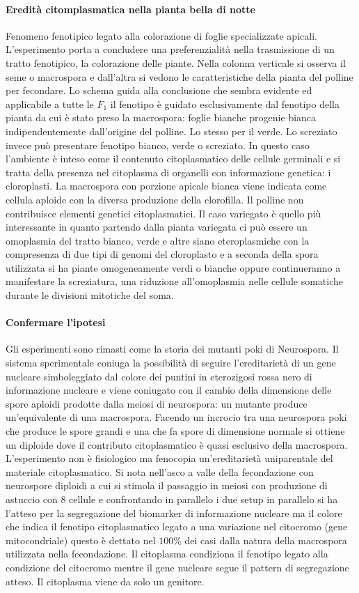 \paragraph{Eredit\`a citomplasmatica nella pianta bella di notte}
Fenomeno fenotipico legato alla colorazione di foglie specializzate apicali. L'esperimento porta a concludere una preferenzialit\`a nella trasmissione di un tratto fenotipico, la 
colorazione delle piante. Nella colonna verticale si osserva il seme o macrospora e dall'altra si vedono le caratteristiche della pianta del polline per fecondare. Lo schema guida
alla conclusione che sembra evidente ed applicabile a tutte le $F_1$ il fenotipo \`e guidato esclusivamente dal fenotipo della pianta da cui \`e stato preso la macrospora: foglie bianche
progenie bianca indipendentemente dall'origine del polline. Lo stesso per il verde. Lo screziato invece pu\`o presentare fenotipo bianco, verde o screziato. In questo caso 
l'ambiente \`e inteso come il contenuto citoplasmatico delle cellule germinali e si tratta della presenza nel citoplasma di organelli con informazione genetica: i cloroplasti. La
macrospora con porzione apicale bianca viene indicata come cellula aploide con la diversa produzione della clorofilla. Il polline non contribuisce elementi genetici citoplasmatici. 
Il caso variegato \`e quello pi\`u interessante in quanto partendo dalla pianta variegata ci pu\`o essere un omoplasmia del tratto bianco, verde e altre siano eteroplasmiche con la 
compresenza di due tipi di genomi del cloroplasto e a seconda della spora utilizzata si ha piante omogeneamente verdi o bianche oppure continueranno a manifestare la screziatura, una
riduzione all'omoplasmia nelle cellule somatiche durante le divisioni mitotiche del soma. 
\paragraph{Confermare l'ipotesi}
Gli esperimenti sono rimasti come la storia dei mutanti poki di Neurospora. Il sistema sperimentale coniuga la possibilit\`a di seguire l'ereditariet\`a di un gene nucleare simboleggiato
dal colore dei puntini in eterozigosi rossa nero di informazione nucleare e viene coniugato con il cambio della dimensione delle spore aploidi prodotte dalla meiosi di neurospora: un
mutante produce un'equivalente di una macrospora. Facendo un incrocio tra una neurospora poki che produce le spore grandi e una che fa spore di dimensione normale si ottiene un diploide
dove il contributo citoplasmatico \`e quasi esclusivo della macrospora. L'esperimento non \`e fisiologico ma fenocopia un'ereditariet\`a uniparentale del materiale citoplasmatico. 
Si nota nell'asco a valle della fecondazione con neurospore diploidi a cui si stimola il passaggio in meiosi con produzione di astuccio con $8$ cellule e confrontando in parallelo
i due setup in parallelo si ha l'atteso per la segregazione del biomarker di informazione nucleare ma il colore che indica il fenotipo citoplasmatico legato a una variazione nel 
citocromo (gene mitocondriale) questo \`e dettato nel $100\%$ dei casi dalla natura della macrospora utilizzata nella fecondazione. Il citoplasma condiziona il fenotipo legato alla
condizione del citocromo mentre il gene nucleare segue il pattern di segregazione atteso. Il citoplasma viene da solo un genitore. 
